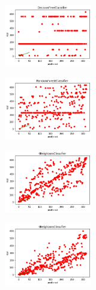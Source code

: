 \begin{figure}
           \begin{subfigure}[t]{1.5in}
            \centering
                \includegraphics[width=1.5in]{output_66_1.png}  
                \caption{}
        \end{subfigure}
        \begin{subfigure}[t]{1.5in}
            \centering
            \includegraphics[width=1.5in]{output_66_3.png} 
            \caption{}
        \end{subfigure}
        \begin{subfigure}[t]{1.5in}
            \centering
            \includegraphics[width=1.5in]{output_69_1.png}
            \caption{}
        \end{subfigure}
            \begin{subfigure}[t]{1.5in}
            \centering
            \includegraphics[width=1.5in]{output_71_1.png}
            \caption{}   
        \end{subfigure}
        
        \medskip  %
            

\end{figure}
